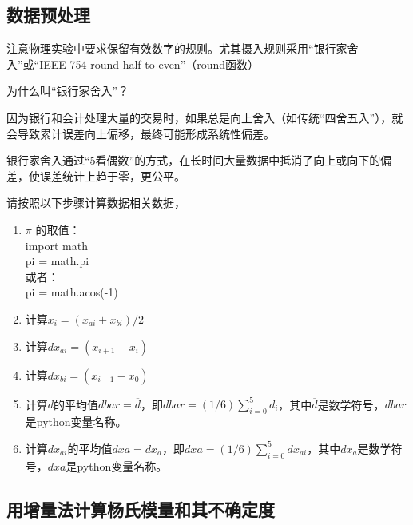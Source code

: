\subsection{数据预处理}
注意物理实验中要求保留有效数字的规则。尤其摄入规则采用“银行家舍入”或“IEEE 754 round half to even”（round函数）

为什么叫“银行家舍入”？

因为银行和会计处理大量的交易时，如果总是向上舍入（如传统“四舍五入”），就会导致累计误差向上偏移，最终可能形成系统性偏差。

银行家舍入通过“5看偶数”的方式，在长时间大量数据中抵消了向上或向下的偏差，使误差统计上趋于零，更公平。

请按照以下步骤计算数据相关数据，

\begin{enumerate}
  \item $\pi$ 的取值：\\
  import math \\
  pi = math.pi \\
  或者：\\
  pi = math.acos(-1) \\
  \item 计算$x_{i} = \left( x_{ai} + x_{bi} \right) / 2$
  \item 计算$dx_{ai} = (x_{i+1} - x_{i})$
  \item 计算$dx_{bi} = (x_{i+1} - x_{0})$
  \item 计算$d$的平均值$dbar = \overline{d}$，即$dbar = (1/6)\sum\limits_{i=0}^{5}d_i$，其中$\overline{d}$是数学符号，$dbar$是python变量名称。
  \item 计算$dx_{ai}$的平均值$dxa = \overline{dx_{a}}$，即$dxa = (1/6)\sum\limits_{i=0}^{5}dx_{ai}$，其中$\overline{dx_{a}}$是数学符号，$dxa$是python变量名称。
\end{enumerate}

\subsection{用增量法计算杨氏模量和其不确定度}

